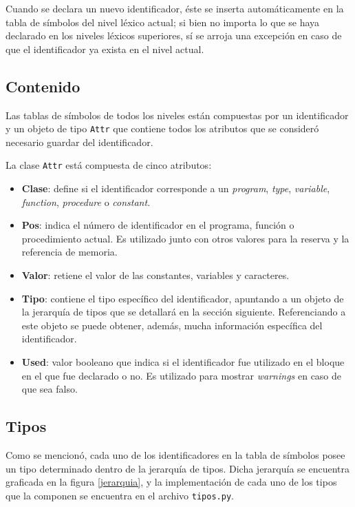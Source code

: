 \documentclass[a4paper,oneside]{report}
\begin{document}
Cuando se declara un nuevo identificador, éste se inserta automáticamente en la tabla de símbolos del nivel léxico actual; si bien no importa lo que se haya declarado en los niveles léxicos superiores, sí se arroja una excepción en caso de que el identificador ya exista en el nivel actual.

\subsection{Contenido}
Las tablas de símbolos de todos los niveles están compuestas por un identificador y un objeto de tipo \texttt{Attr} que contiene todos los atributos que se consideró necesario guardar del identificador.

La clase \texttt{Attr} está compuesta de cinco atributos:

\begin{itemize}
 \item {\bf Clase}: define si el identificador corresponde a un \emph{program}, \emph{type}, \emph{variable}, \emph{function}, \emph{procedure} o \emph{constant}.
 \item {\bf Pos}: indica el número de identificador en el programa, función o procedimiento actual. Es utilizado junto con otros valores para la reserva y la referencia de memoria.
 \item {\bf Valor}: retiene el valor de las constantes, variables y caracteres.
 \item {\bf Tipo}: contiene el tipo específico del identificador, apuntando a un objeto de la jerarquía de tipos que se detallará en la sección siguiente. Referenciando a este objeto se puede obtener, además, mucha información específica del identificador.
 \item {\bf Used}: valor booleano que indica si el identificador fue utilizado en el bloque en el que fue declarado o no. Es utilizado para mostrar \textit{warnings} en caso de que sea falso.
\end{itemize}

\subsection{Tipos}

Como se mencionó, cada uno de los identificadores en la tabla de símbolos posee un tipo determinado dentro de la jerarquía de tipos. Dicha jerarquía se encuentra graficada en la figura \ref{jerarquia}, y la implementación de cada uno de los tipos que la componen se encuentra en el archivo \texttt{tipos.py}.
\end{document}

